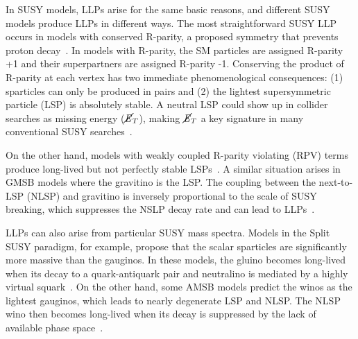 \documentclass[12pt]{article}
\begin{document}
    In SUSY models, LLPs arise for the same basic reasons, and different SUSY models produce LLPs in different ways. The most straightforward SUSY LLP occurs in models with conserved R-parity, a proposed symmetry that prevents proton decay~\cite{primer}. In models with R-parity, the SM particles are assigned R-parity +1 and their superpartners are assigned R-parity -1. Conserving the product of R-parity at each vertex has two immediate phenomenological consequences: (1) sparticles can only be produced in pairs and (2) the lightest supersymmetric particle (LSP) is absolutely stable. A neutral LSP could show up in collider searches as missing energy ($\cancel{\it{E}}_{T}$), making $\cancel{\it{E}}_{T}$ a key signature in many conventional SUSY searches~\cite{primer}.

    On the other hand, models with weakly coupled R-parity violating (RPV) terms produce long-lived but not perfectly stable LSPs~\cite{fate}. A similar situation arises in GMSB models where the gravitino is the LSP. The coupling between the next-to-LSP (NLSP) and gravitino is inversely proportional to the scale of SUSY breaking, which suppresses the NSLP decay rate and can lead to LLPs~\cite{dimopoulos_low_energy}.


    LLPs can also arise from particular SUSY mass spectra. Models in the Split SUSY paradigm, for example, propose that the scalar sparticles are significantly more massive than the gauginos. In these models, the gluino becomes long-lived when its decay to a quark-antiquark pair and neutralino is mediated by a highly virtual squark~\cite{kilian_split}.  On the other hand, some AMSB models predict the winos as the lightest gauginos, which leads to nearly degenerate LSP and NLSP. The NLSP wino then becomes long-lived when its decay is suppressed by the lack of available phase space~\cite{randall_sundrum_out_of_this_world}.

\end{document}
